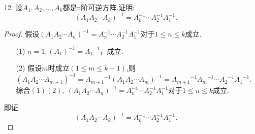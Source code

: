 \documentclass{article}
\begin{document}
\begin{enumerate}
        \begin{proof}
        设$A$是与任意n阶方阵都乘法可交换的方阵.
        \[
            \forall 1\leqslant i\leqslant n,E_{ij} A=A E_{ij}.
        \] 
        \begin{align*}
             E_{ij}A&=(b_{mn})=
            \begin{cases}
                b_{mn}=a_{jn} &m=i;\\
                b_{mn}=0      &m\neq i.
            \end{cases},\\
            AE_{ij}&=(c_{mn})=
            \begin{cases}
                c_{mn}=a_{mi} &n=j;\\
                c_{mn}=0      &n\neq i.
            \end{cases}\\
            \Rightarrow
            &a_{ii}=a_{jj},a_{jn}=0,a_{mi}=0(m\neq i,n\neq j)
            \Rightarrow
            \begin{cases}
                a_{ii}=a_{jj},&\forall i, j.\\
                a_{ij}=0,&\forall i\neq j.
            \end{cases}     
        \end{align*}
        即证$A$为数量阵.    
    \end{proof}
        \item [12.]设$A_1,A_2,\ldots,A_k$都是n阶可逆方阵.证明:
        \[{(A_1 A_2 \cdots A_k)}^{-1}=A_k^{-1} \cdots A_2^{-1} A_1^{-1}.\]

        \begin{proof}
            假设${(A_1 A_2 \cdots A_n)}^{-1}=A_n^{-1} \cdots A_2^{-1} A_1^{-1}$对于$1\leqslant n\leqslant k$成立.
        \begin{enumerate}
            \item [(1)]$n=1,{(A_1)}^{-1}={A_1}^{-1}$，成立.
            \item [(2)]假设$m$时成立$(1\leqslant m\leqslant k-1)$,则
            \[{(A_1 A_2 \cdots A_{m+1})}^{-1}={A_{m+1}}^{-1} {(A_1 A_2 \cdots A_m)}^{-1}={A_{m+1}}^{-1}{A_m}^{-1}\cdots {A_2}^{-1} {A_1}^{-1}.\]
            综合$(1)(2),\ {(A_1 A_2 \cdots A_n)}^{-1}=A_n^{-1} \cdots A_2^{-1} A_1^{-1}$对于$1\leqslant n\leqslant k$成立.
        \end{enumerate}
        即证\[{(A_1 A_2 \cdots A_k)}^{-1}=A_k^{-1} \cdots A_2^{-1} A_1^{-1}.\]
        \end{proof}
    \end{enumerate}
\end{document}
